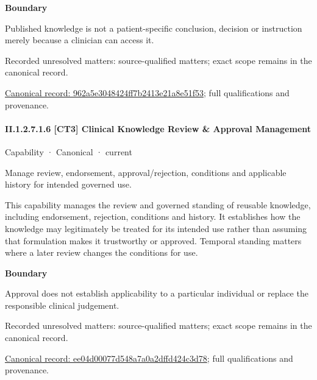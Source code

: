 \textbf{Boundary}



Published knowledge is not a patient-specific conclusion, decision or instruction merely because a clinician can access it.


{\small Recorded unresolved matters: source-qualified matters; exact scope remains in the canonical record.}\par
{\footnotesize \href{../../../../continuum/strategy/capability/962a5e3048424ff7b2413e21a8e51f53.md}{Canonical record: 962a5e3048424ff7b2413e21a8e51f53}; full qualifications and provenance.}\par
\paragraph*{II.1.2.7.1.6 [CT3] Clinical Knowledge Review \& Approval Management}
\label{navigation:II.1.2.7.1.6}

\label{element:ee04d00077d548a7a0a2dffd424c3d78}
{\small Capability · Canonical · current}\par

Manage review, endorsement, approval/rejection, conditions and applicable history for intended governed use.



This capability manages the review and governed standing of reusable knowledge, including endorsement, rejection, conditions and history. It establishes how the knowledge may legitimately be treated for its intended use rather than assuming that formulation makes it trustworthy or approved. Temporal standing matters where a later review changes the conditions for use.



\textbf{Boundary}



Approval does not establish applicability to a particular individual or replace the responsible clinical judgement.


{\small Recorded unresolved matters: source-qualified matters; exact scope remains in the canonical record.}\par
{\footnotesize \href{../../../../continuum/strategy/capability/ee04d00077d548a7a0a2dffd424c3d78.md}{Canonical record: ee04d00077d548a7a0a2dffd424c3d78}; full qualifications and provenance.}\par
